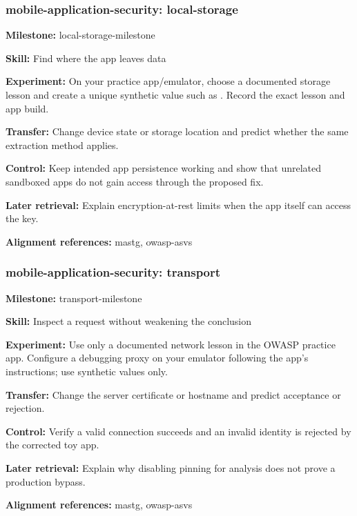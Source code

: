 \subsubsection{mobile-application-security: local-storage}
\noindent\textbf{Milestone:} local-storage-milestone\par
\noindent\textbf{Skill:} Find where the app leaves data\par
\noindent\textbf{Experiment:} On your practice app/emulator, choose a documented storage lesson and create a unique synthetic value such as . Record the exact lesson and app build.\par
\noindent\textbf{Transfer:} Change device state or storage location and predict whether the same extraction method applies.\par
\noindent\textbf{Control:} Keep intended app persistence working and show that unrelated sandboxed apps do not gain access through the proposed fix.\par
\noindent\textbf{Later retrieval:} Explain encryption-at-rest limits when the app itself can access the key.\par
\noindent\textbf{Alignment references:} mastg, owasp-asvs\par
\subsubsection{mobile-application-security: transport}
\noindent\textbf{Milestone:} transport-milestone\par
\noindent\textbf{Skill:} Inspect a request without weakening the conclusion\par
\noindent\textbf{Experiment:} Use only a documented network lesson in the OWASP practice app. Configure a debugging proxy on your emulator following the app’s instructions; use synthetic values only.\par
\noindent\textbf{Transfer:} Change the server certificate or hostname and predict acceptance or rejection.\par
\noindent\textbf{Control:} Verify a valid connection succeeds and an invalid identity is rejected by the corrected toy app.\par
\noindent\textbf{Later retrieval:} Explain why disabling pinning for analysis does not prove a production bypass.\par
\noindent\textbf{Alignment references:} mastg, owasp-asvs\par

